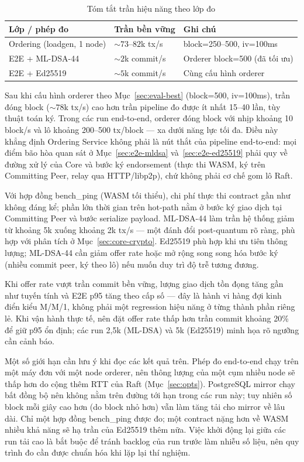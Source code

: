 \begin{table}[H]
\centering
\caption{Tóm tắt trần hiệu năng theo lớp đo}
\label{tab:eval-summary}
\begin{tabular}{@{}p{4.5cm}p{3.5cm}p{5cm}@{}}
\toprule
Lớp / phép đo & Trần bền vững & Ghi chú \\
\midrule
Ordering (loadgen, 1 node) & ${\sim}73$--$82$k tx/s & block=250--500, iv=100ms \\
E2E + ML-DSA-44 & ${\sim}2$k commit/s & Orderer block=500 (đã tối ưu) \\
E2E + Ed25519 & ${\sim}5$k commit/s & Cùng cấu hình orderer \\
\bottomrule
\end{tabular}
\end{table}

Sau khi cấu hình orderer theo Mục~\ref{sec:eval-best} (block=500, iv=100ms),
trần đóng block (${\sim}78$k tx/s) cao hơn trần pipeline đo được ít nhất
15--40 lần, tùy thuật toán ký. Trong các run end-to-end, orderer đóng block
với nhịp khoảng 10 block/s và lô khoảng 200--500 tx/block --- xa dưới năng
lực tối đa. Điều này khẳng định Ordering Service không phải là nút thắt của
pipeline end-to-end: mọi điểm bão hòa quan sát ở
Mục~\ref{sec:e2e-mldsa} và~\ref{sec:e2e-ed25519} phải quy về đường xử lý của
Core và bước ký endorsement (thực thi WASM, ký trên Committing Peer, relay
qua HTTP/libp2p), chứ không phải cơ chế gom lô Raft.

Với hợp đồng bench\_ping (WASM tối thiểu), chi phí thực thi contract gần như
không đáng kể; phần lớn thời gian trên hot-path nằm ở bước ký giao dịch tại
Committing Peer và bước serialize payload. ML-DSA-44 làm trần hệ thống giảm
từ khoảng 5k xuống khoảng 2k tx/s --- một đánh đổi post-quantum rõ ràng, phù
hợp với phân tích ở Mục~\ref{sec:core-crypto}. Ed25519 phù hợp khi ưu tiên
thông lượng; ML-DSA-44 cần giảm offer rate hoặc mở rộng song song hóa bước ký
(nhiều commit peer, ký theo lô) nếu muốn duy trì độ trễ tương đương.

Khi offer rate vượt trần commit bền vững, lượng giao dịch tồn đọng tăng gần
như tuyến tính và E2E p95 tăng theo cấp số --- đây là hành vi hàng đợi kinh
điển kiểu M/M/1, không phải một regression hiệu năng ở từng thành phần riêng
lẻ. Khi vận hành thực tế, nên đặt offer rate thấp hơn trần commit khoảng 20\%
để giữ p95 ổn định; các run 2,5k (ML-DSA) và 5k (Ed25519) minh họa rõ ngưỡng
cần cảnh báo.

Một số giới hạn cần lưu ý khi đọc các kết quả trên. Phép đo end-to-end chạy
trên một máy đơn với một node orderer, nên thông lượng của một cụm nhiều node
sẽ thấp hơn do cộng thêm RTT của Raft (Mục~\ref{sec:opts}). PostgreSQL mirror
chạy bất đồng bộ nên không nằm trên đường tới hạn trong các run này; tuy
nhiên số block mỗi giây cao hơn (do block nhỏ hơn) vẫn làm tăng tải cho mirror
về lâu dài. Chỉ một hợp đồng bench\_ping được đo; một contract nặng hơn về
WASM nhiều khả năng sẽ hạ trần của Ed25519 thêm nữa. Việc khởi động lại giữa
các run tải cao là bắt buộc để tránh backlog của run trước làm nhiễu số liệu,
nên quy trình đo cần được chuẩn hóa khi lặp lại thí nghiệm.

